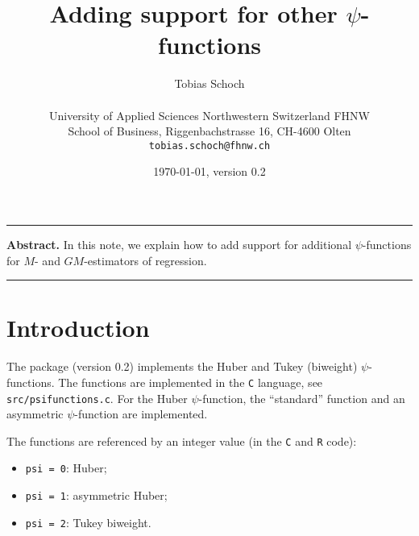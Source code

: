 \documentclass[a4paper,oneside,11pt,DIV=12]{scrartcl}
\newcommand{\code}[1]{{\texttt{#1}}}
\begin{document}

\title{Adding support for other $\psi$-functions}

\author{{\normalsize Tobias Schoch} \\
\begin{minipage}[t][][t]{\textwidth}
	\begin{center}
	\small{University of Applied Sciences Northwestern Switzerland FHNW} \\
	\small{School of Business, Riggenbachstrasse 16, CH-4600 Olten} \\
	\small{\texttt{tobias.schoch{@}fhnw.ch}}
	\end{center}
\end{minipage}}

\date{{\small \today, version 0.2}}
\maketitle

\renewenvironment{abstract}{%
\begin{center}\begin{minipage}{0.9\textwidth}
\rule{\textwidth}{0.4pt}
{\sffamily\bfseries\footnotesize Abstract.}\small}
{\par\noindent\rule{\textwidth}{0.4pt}\end{minipage}\end{center}}

\begin{abstract}
In this note, we explain how to add support for additional $\psi$-functions
for $M$- and $GM$-estimators of regression.
\end{abstract}

\vspace{1em}


\section{Introduction}
The package (version 0.2) implements the Huber and Tukey (biweight)
$\psi$-functions. The functions are implemented in the \code{C} language,
see \code{src/psifunctions.c}. For the Huber $\psi$-function, the
``standard'' function and an asymmetric $\psi$-function are implemented.

The functions are referenced by an integer value (in the \code{C}
and \code{R} code):
\begin{itemize}
    \item \code{psi = 0}: Huber;
    \item \code{psi = 1}: asymmetric Huber;
    \item \code{psi = 2}: Tukey biweight.
\end{itemize}
\end{document}
